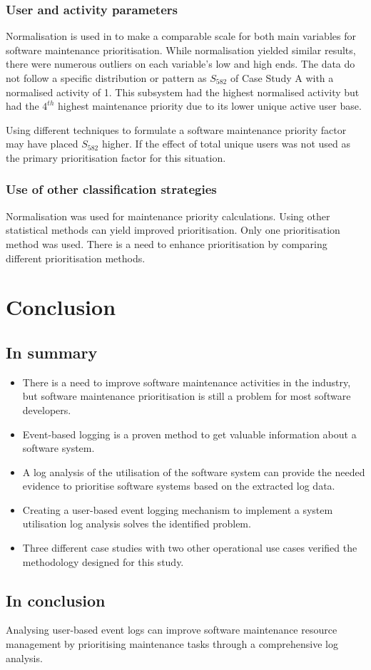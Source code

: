 \subsubsection{User and activity parameters}
\par Normalisation is used in  to make a comparable scale for both main variables for software maintenance prioritisation. While normalisation yielded similar results, there were numerous outliers on each variable's low and high ends. The data do not follow a specific distribution or pattern as $S_{582}$ of Case Study A with a normalised activity of 1. This subsystem had the highest normalised activity but had the $4^{th}$ highest maintenance priority due to its lower unique active user base.\par Using different techniques to formulate a software maintenance priority factor may have placed $S_{582}$ higher. If the effect of total unique users was not used as the primary prioritisation factor for this situation. 

\subsubsection{Use of other classification strategies}
Normalisation was used for maintenance priority calculations. Using other statistical methods can yield improved prioritisation. Only one prioritisation method was used. There is a need to enhance prioritisation by comparing different prioritisation methods.

\section{Conclusion}

\subsection{In summary}
\begin{itemize}
	\item There is a need to improve software maintenance activities in the industry, but software maintenance prioritisation is still a problem for most software developers.
	\item Event-based logging is a proven method to get valuable information about a software system.
	\item A log analysis of the utilisation of the software system can provide the needed evidence to prioritise software systems based on the extracted log data.
	\item Creating a user-based event logging mechanism to implement a system utilisation log analysis solves the identified problem.
	\item Three different case studies with two other operational use cases verified the methodology designed for this study.
\end{itemize}

\subsection{In conclusion}
Analysing user-based event logs can improve software maintenance resource management by prioritising maintenance tasks through a comprehensive log analysis.